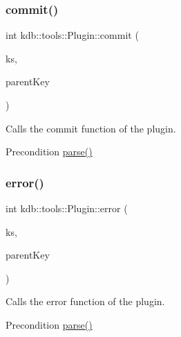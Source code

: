 \subsubsection{\texorpdfstring{commit()}{commit()}}
{\footnotesize\ttfamily int kdb\+::tools\+::\+Plugin\+::commit (\begin{DoxyParamCaption}\item[{\mbox{\hyperlink{classkdb_1_1KeySet}{kdb\+::\+Key\+Set}} \&}]{ks,  }\item[{\mbox{\hyperlink{classkdb_1_1Key}{kdb\+::\+Key}} \&}]{parent\+Key }\end{DoxyParamCaption})}



Calls the commit function of the plugin. 

\begin{DoxyPrecond}{Precondition}
\mbox{\hyperlink{classkdb_1_1tools_1_1Plugin_adfcba2fbdeb436a1083410df804d5fb0}{parse()}} 
\end{DoxyPrecond}
\mbox{\label{classkdb_1_1tools_1_1Plugin_a8ec348b49a34ef17fda64cb289b8cf64}} 
\subsubsection{\texorpdfstring{error()}{error()}}
{\footnotesize\ttfamily int kdb\+::tools\+::\+Plugin\+::error (\begin{DoxyParamCaption}\item[{\mbox{\hyperlink{classkdb_1_1KeySet}{kdb\+::\+Key\+Set}} \&}]{ks,  }\item[{\mbox{\hyperlink{classkdb_1_1Key}{kdb\+::\+Key}} \&}]{parent\+Key }\end{DoxyParamCaption})}



Calls the error function of the plugin. 

\begin{DoxyPrecond}{Precondition}
\mbox{\hyperlink{classkdb_1_1tools_1_1Plugin_adfcba2fbdeb436a1083410df804d5fb0}{parse()}} 
\end{DoxyPrecond}
\mbox{\label{classkdb_1_1tools_1_1Plugin_a7911f8c46aea6fe4ec6fcb4788b77beb}} 
